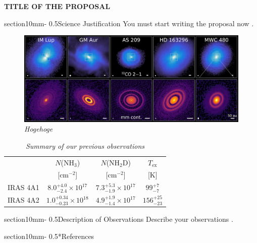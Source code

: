 \documentclass[letterpaper,11pt,twocolumn]{article}
\makeatletter
\renewcommand{\section}{\@startsection%
{section}{1}{0mm}{-\baselineskip}%
{0.5\baselineskip}{\normalfont\Large\bfseries}}%
\makeatother
\begin{document}
\pagestyle{plain}


\begin{center} 
\bfseries\uppercase{%
Title of the proposal
}
\end{center}



\section{Science Justification}
You must start writing the proposal now \citep{Yamato22}.

\begin{figure}[h]
    \centering
    \includegraphics[width=\hsize]{MAPS_disks.png}
    \caption{\em{Hogehoge}}
    \label{fig:MAPS_disks}
\end{figure}


\begin{table}[h]
    \centering
    \caption{\em{Summary of our previous observations}}
    \label{tab:transitions}
    \begin{tabular}{cccc}\hline
         & $N$(NH$_3$) & $N$(NH$_2$D) & $T_\mathrm{ex}$  \\
                   & [cm$^{-2}$] & [cm$^{-2}$]  & [K]  \\
        \hline
    IRAS 4A1 & $8.0^{+4.0}_{-2.4}\times 10^{17}$ & $7.3^{+5.3}_{-1.9}\times 10^{17}$ & $99^{+7}_{-7}$ \\
    IRAS 4A2 & $1.0^{+0.34}_{-0.23}\times 10^{18}$ & $4.9^{+1.9}_{-1.4}\times 10^{17}$ & $156^{+25}_{-23}$ \\
    \hline
    \end{tabular}
\end{table}


\section{Description of Observations}
Describe your observations \citep{Yamato22}.




\section*{References}




\end{document}
